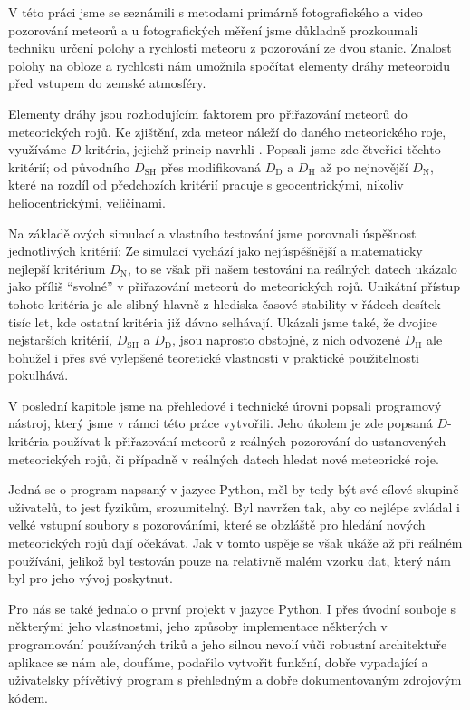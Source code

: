 V této práci jsme se seznámili s metodami primárně fotografického a video pozorování meteorů a u fotografických měření jsme důkladně prozkoumali techniku určení polohy a rychlosti meteoru z pozorování ze dvou stanic. Znalost polohy na obloze a rychlosti nám umožnila spočítat elementy dráhy meteoroidu před vstupem do zemské atmosféry.

\medskip

Elementy dráhy jsou rozhodujícím faktorem pro přiřazování meteorů do meteorických rojů. Ke zjištění, zda meteor náleží do daného meteorického roje, využíváme $D$-kritéria, jejichž princip navrhli \citeauthor{dsh}. Popsali jsme zde čtveřici těchto kritérií; od původního $D_\text{SH}$ přes modifikovaná $D_\text{D}$ a $D_\text{H}$ až po nejnovější $D_\text{N}$, které na rozdíl od předchozích kritérií pracuje s geocentrickými, nikoliv heliocentrickými, veličinami.

Na základě \citeauthor{galligan}ových simulací a vlastního testování jsme porovnali úspěšnost jednotlivých kritérií: Ze simulací vychází jako nejúspěšnější a matematicky nejlepší kritérium $D_\text{N}$, to se však při našem testování na reálných datech ukázalo jako příliš "`svolné"' v přiřazování meteorů do meteorických rojů. Unikátní přístup tohoto kritéria je ale slibný hlavně z hlediska časové stability v řádech desítek tisíc let, kde ostatní kritéria již dávno selhávají. Ukázali jsme také, že dvojice nejstarších kritérií, $D_\text{SH}$ a $D_\text{D}$, jsou naprosto obstojné, z nich odvozené $D_\text{H}$ ale bohužel i přes své vylepšené teoretické vlastnosti v praktické použitelnosti pokulhává.

\medskip

V poslední kapitole jsme na přehledové i technické úrovni popsali programový nástroj, který jsme v rámci této práce vytvořili. Jeho úkolem je zde popsaná $D$-kritéria používat k přiřazování meteorů z reálných pozorování do ustanovených meteorických rojů, či případně v reálných datech hledat nové meteorické roje.

Jedná se o program napsaný v jazyce Python, měl by tedy být své cílové skupině uživatelů, to jest fyzikům, srozumitelný. Byl navržen tak, aby co nejlépe zvládal i velké vstupní soubory s pozorováními, které se obzláště pro hledání nových meteorických rojů dají očekávat. Jak v tomto uspěje se však ukáže až při reálném používáni, jelikož byl testován pouze na relativně malém vzorku dat, který nám byl pro jeho vývoj poskytnut.

\smallskip

Pro nás se také jednalo o první projekt v jazyce Python. I přes úvodní souboje s některými jeho vlastnostmi, jeho způsoby implementace některých v programování používaných triků a jeho silnou nevolí vůči robustní architektuře aplikace se nám ale, doufáme, podařilo vytvořit funkční, dobře vypadající a uživatelsky přívětivý program s přehledným a dobře dokumentovaným zdrojovým kódem.
% 
